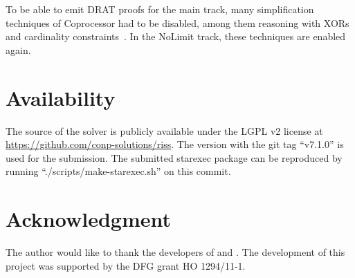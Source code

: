 \documentclass[conference]{IEEEtran}
\begin{document}
To be able to emit DRAT proofs for the main track, many simplification techniques of Coprocessor had to be disabled, among them reasoning with XORs and cardinality constraints~\cite{Mlazycard}. 
In the NoLimit track, these techniques are enabled again.

\section{Availability}

The source of the solver is publicly available under the LGPL v2 license at \url{https://github.com/conp-solutions/riss}.
The version with the git tag ``v7.1.0'' is used for the submission.
The submitted starexec package can be reproduced by running ``./scripts/make-starexec.sh'' on this commit.

\section*{Acknowledgment}
The author would like to thank the developers of \glucose and \minisat. 
The development of this project was supported by the DFG grant HO 1294/11-1.



\end{document}
